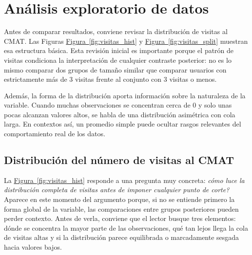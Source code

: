 \documentclass[10pt,letterpaper]{article} %
\numberwithin{figure}{subsection}
\let\oldsection\section
\renewcommand{\section}{\clearpage\oldsection}
\begin{document}
\begin{table}[!htbp]
    \centering
    \caption{Resumen de variables de calificación utilizadas en el proceso analítico.}
    \label{tab:data_grades}
    
\end{table}

\begin{table}[!htbp]
    \centering
    \caption{Tokens no numéricos observados en la calificación cruda.}
    \label{tab:data_grade_tokens}
    
\end{table}


\FloatBarrier
\section{Análisis exploratorio de datos}

Antes de comparar resultados, conviene revisar la distribución de visitas al CMAT. Las Figuras \hyperref[fig:visitas_hist]{Figura~\ref{fig:visitas_hist}} y \hyperref[fig:visitas_split]{Figura~\ref{fig:visitas_split}} muestran esa estructura básica. Esta revisión inicial es importante porque el patrón de visitas condiciona la interpretación de cualquier contraste posterior: no es lo mismo comparar dos grupos de tamaño similar que comparar usuarios con estrictamente más de 3 visitas frente al conjunto con 3 visitas o menos.

Además, la forma de la distribución aporta información sobre la naturaleza de la variable. Cuando muchas observaciones se concentran cerca de 0 y solo unas pocas alcanzan valores altos, se habla de una distribución asimétrica con cola larga. En contextos así, un promedio simple puede ocultar rasgos relevantes del comportamiento real de los datos.

\subsection{Distribución del número de visitas al CMAT}
La \hyperref[fig:visitas_hist]{Figura~\ref{fig:visitas_hist}} responde a una pregunta muy concreta: \emph{cómo luce la distribución completa de visitas antes de imponer cualquier punto de corte?} Aparece en este momento del argumento porque, si no se entiende primero la forma global de la variable, las comparaciones entre grupos posteriores pueden perder contexto. Antes de verla, conviene que el lector busque tres elementos: dónde se concentra la mayor parte de las observaciones, qué tan lejos llega la cola de visitas altas y si la distribución parece equilibrada o marcadamente sesgada hacia valores bajos.
\end{document}
